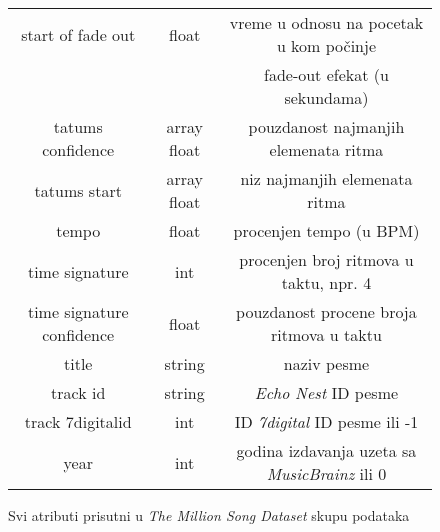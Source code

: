 \begin{figure}[H]
\begin{tabular}{|c|c|c|}
        start of fade out & float & vreme u odnosu na pocetak u kom po\v{c}inje \\
        & & fade-out efekat (u sekundama) \\
        tatums confidence & array float & pouzdanost najmanjih elemenata ritma \\
        tatums start & array float & niz najmanjih elemenata ritma \\
        tempo & float & procenjen tempo (u BPM) \\
        time signature & int & procenjen broj ritmova u taktu, npr. 4 \\
        time signature confidence & float & pouzdanost procene broja ritmova u taktu \\
        title & string & naziv pesme \\
        track id & string & \emph{Echo Nest} ID pesme \\
        track 7digitalid & int & ID \emph{7digital} ID pesme ili -1 \\
        year & int & godina izdavanja uzeta sa \emph{MusicBrainz} ili 0 \\
        \hline
    \end{tabular}
    \caption{Svi atributi prisutni u \emph{The Million Song Dataset} skupu podataka}
    \label{fig:Atributi}
\end{figure}

